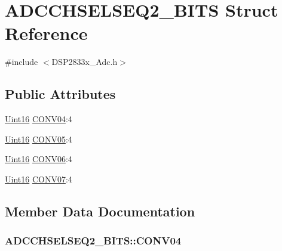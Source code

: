 \hypertarget{struct_a_d_c_c_h_s_e_l_s_e_q2___b_i_t_s}{}\section{A\+D\+C\+C\+H\+S\+E\+L\+S\+E\+Q2\+\_\+\+B\+I\+T\+S Struct Reference}
\label{struct_a_d_c_c_h_s_e_l_s_e_q2___b_i_t_s}


{\ttfamily \#include $<$D\+S\+P2833x\+\_\+\+Adc.\+h$>$}

\subsection*{Public Attributes}
\begin{DoxyCompactItemize}
\item 
\hyperlink{_d_s_p2833x___device_8h_a59a9f6be4562c327cbfb4f7e8e18f08b}{Uint16} \hyperlink{struct_a_d_c_c_h_s_e_l_s_e_q2___b_i_t_s_acbb80a59c95915417e30565d908b2ac1}{C\+O\+N\+V04}\+:4
\item 
\hyperlink{_d_s_p2833x___device_8h_a59a9f6be4562c327cbfb4f7e8e18f08b}{Uint16} \hyperlink{struct_a_d_c_c_h_s_e_l_s_e_q2___b_i_t_s_a43fba800b490348dcf8a298f46e7af35}{C\+O\+N\+V05}\+:4
\item 
\hyperlink{_d_s_p2833x___device_8h_a59a9f6be4562c327cbfb4f7e8e18f08b}{Uint16} \hyperlink{struct_a_d_c_c_h_s_e_l_s_e_q2___b_i_t_s_a9e0c7789e500bae02ea09aa7a5765a99}{C\+O\+N\+V06}\+:4
\item 
\hyperlink{_d_s_p2833x___device_8h_a59a9f6be4562c327cbfb4f7e8e18f08b}{Uint16} \hyperlink{struct_a_d_c_c_h_s_e_l_s_e_q2___b_i_t_s_a26a6645ce13192c8fddcf873acdfc398}{C\+O\+N\+V07}\+:4
\end{DoxyCompactItemize}


\subsection{Member Data Documentation}
\hypertarget{struct_a_d_c_c_h_s_e_l_s_e_q2___b_i_t_s_acbb80a59c95915417e30565d908b2ac1}{}
\subsubsection[{C\+O\+N\+V04}]{ A\+D\+C\+C\+H\+S\+E\+L\+S\+E\+Q2\+\_\+\+B\+I\+T\+S\+::\+C\+O\+N\+V04}\label{struct_a_d_c_c_h_s_e_l_s_e_q2___b_i_t_s_acbb80a59c95915417e30565d908b2ac1}
\hypertarget{struct_a_d_c_c_h_s_e_l_s_e_q2___b_i_t_s_a43fba800b490348dcf8a298f46e7af35}{}
